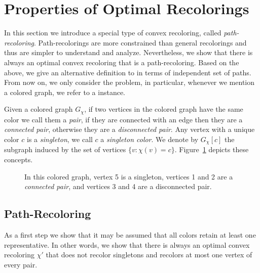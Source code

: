 
\section{Properties of Optimal Recolorings}
\label{sec:path_recoloring}

In this section we introduce a special type of convex recoloring,
called \emph{path-recoloring}. 
%
Path-recolorings are more constrained than general recolorings and thus are simpler to
understand and analyze.
%
Nevertheless, 
we show that there is always an optimal convex recoloring that is a path-recoloring.
%
Based on the above, 
we give an alternative definition to \TWOCR{} in terms of independent set of paths.
%
From now on, we only consider the \TWOCR{} problem,
in particular, 
whenever we mention a colored graph, 
we refer to a \TWOCR{} instance.

Given a colored graph $G_\chi$, 
if two vertices in the colored graph have the same color we call them a \emph{pair}, 
if they are connected with an edge then they are a \emph{connected pair}, 
otherwise they are a \emph{disconnected pair}.  
%
Any vertex with a unique color $c$ is a \emph{singleton}, 
we call $c$ a \emph{singleton color}.
%
We denote by $G_\chi[c]$ the subgraph induced by the set of vertices $\{v : \chi(v) = c\}$.
%
Figure~\ref{fig:concepts} depicts these concepts.


\begin{figure}[t]
\centering
{}
\caption{
	\label{fig:concepts}
	In this colored graph, vertex 5 is a singleton, vertices 1 and 2
	are a \emph{connected pair}, and vertices 3 and 4 are a disconnected pair.
}
\end{figure}


\subsection{Path-Recoloring}

As a first step we show that it may be assumed that all 
colors retain at least one representative.
%
In other words,
we show that there is always an optimal convex recoloring $\chi'$ 
that does not recolor singletons and recolors at most one vertex of every pair. 

